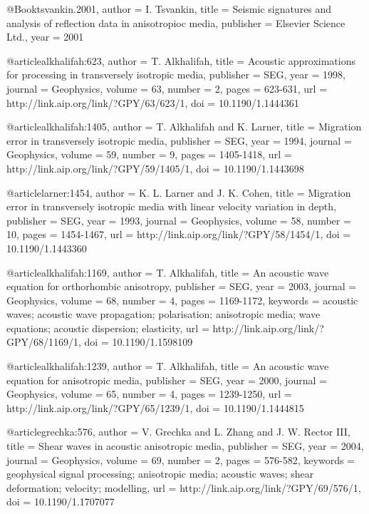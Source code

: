 {@Book{tsvankin.2001,
  author =	 {I. Tsvankin},
  title =	 {Seismic signatures and analysis of reflection data
                  in anisotropioc media},
  publisher =	 {Elsevier Science Ltd.},
  year =	 2001
}

@article{alkhalifah:623,
  author =	 {T. Alkhalifah},
  title =	 {Acoustic approximations for processing in
                  transversely isotropic media},
  publisher =	 {SEG},
  year =	 1998,
  journal =	 {Geophysics},
  volume =	 63,
  number =	 2,
  pages =	 {623-631},
  url =		 {http://link.aip.org/link/?GPY/63/623/1},
  doi =		 {10.1190/1.1444361}
}

@article{alkhalifah:1405,
  author =	 {T. Alkhalifah and K. Larner},
  title =	 {Migration error in transversely isotropic media},
  publisher =	 {SEG},
  year =	 1994,
  journal =	 {Geophysics},
  volume =	 59,
  number =	 9,
  pages =	 {1405-1418},
  url =		 {http://link.aip.org/link/?GPY/59/1405/1},
  doi =		 {10.1190/1.1443698}
}

@article{larner:1454,
  author =	 {K. L. Larner and J. K. Cohen},
  title =	 {Migration error in transversely isotropic media with
                  linear velocity variation in depth},
  publisher =	 {SEG},
  year =	 1993,
  journal =	 {Geophysics},
  volume =	 58,
  number =	 10,
  pages =	 {1454-1467},
  url =		 {http://link.aip.org/link/?GPY/58/1454/1},
  doi =		 {10.1190/1.1443360}
}

@article{alkhalifah:1169,
  author =	 {T. Alkhalifah},
  title =	 {An acoustic wave equation for orthorhombic
                  anisotropy},
  publisher =	 {SEG},
  year =	 2003,
  journal =	 {Geophysics},
  volume =	 68,
  number =	 4,
  pages =	 {1169-1172},
  keywords =	 {acoustic waves; acoustic wave propagation;
                  polarisation; anisotropic media; wave equations;
                  acoustic dispersion; elasticity},
  url =		 {http://link.aip.org/link/?GPY/68/1169/1},
  doi =		 {10.1190/1.1598109}
}

@article{alkhalifah:1239,
  author =	 {T. Alkhalifah},
  title =	 {An acoustic wave equation for anisotropic media},
  publisher =	 {SEG},
  year =	 2000,
  journal =	 {Geophysics},
  volume =	 65,
  number =	 4,
  pages =	 {1239-1250},
  url =		 {http://link.aip.org/link/?GPY/65/1239/1},
  doi =		 {10.1190/1.1444815}
}

@article{grechka:576,
  author =	 {V. Grechka and L. Zhang and J.
                  W. Rector III},
  title =	 {Shear waves in acoustic anisotropic media},
  publisher =	 {SEG},
  year =	 2004,
  journal =	 {Geophysics},
  volume =	 69,
  number =	 2,
  pages =	 {576-582},
  keywords =	 {geophysical signal processing; anisotropic media;
                  acoustic waves; shear deformation; velocity;
                  modelling},
  url =		 {http://link.aip.org/link/?GPY/69/576/1},
  doi =		 {10.1190/1.1707077}
}

}
